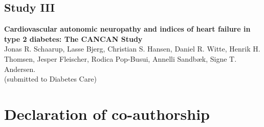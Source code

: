 \documentclass[
  a4paper,
  headsepline=true,
  open=left]{scrbook}
\begin{document}
\clearpage
\null
\thispagestyle{empty}
\clearpage






\newpage
\restoregeometry

\hypertarget{study-iii-1}{%
\section{Study III}\label{study-iii-1}}

\textbf{Cardiovascular autonomic neuropathy and indices of heart failure
in type 2 diabetes: The CANCAN Study}\\
Jonas R. Schaarup, Lasse Bjerg, Christian S. Hansen, Daniel R. Witte,
Henrik H. Thomsen, Jesper Fleischer, Rodica Pop-Busui, Annelli Sandbæk,
Signe T. Andersen.\\
(submitted to Diabetes Care)

\clearpage
\null
\thispagestyle{empty}
\clearpage




\clearpage
\null
\thispagestyle{empty}
\clearpage



\newpage

\restoregeometry

\newpage

\hypertarget{sec-more-results}{%
\chapter{Declaration of co-authorship}\label{sec-more-results}}

\clearpage
\null
\thispagestyle{empty}
\clearpage








\restoregeometry


\backmatter
\end{document}
